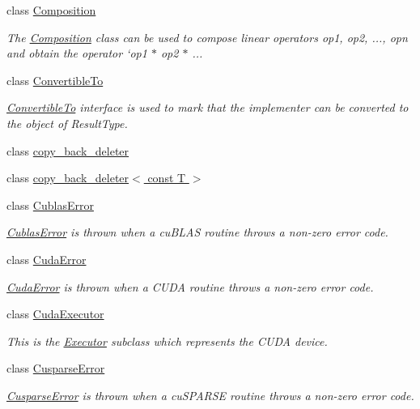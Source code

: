 \begin{DoxyCompactItemize}
class \hyperlink{classgko_1_1Composition}{Composition}
\begin{DoxyCompactList}\small\item\em The \hyperlink{classgko_1_1Composition}{Composition} class can be used to compose linear operators {\ttfamily op1, op2, ..., opn} and obtain the operator `op1 $\ast$ op2 $\ast$ ... \end{DoxyCompactList}\item 
class \hyperlink{classgko_1_1ConvertibleTo}{Convertible\+To}
\begin{DoxyCompactList}\small\item\em \hyperlink{classgko_1_1ConvertibleTo}{Convertible\+To} interface is used to mark that the implementer can be converted to the object of Result\+Type. \end{DoxyCompactList}\item 
class \hyperlink{classgko_1_1copy__back__deleter}{copy\+\_\+back\+\_\+deleter}
\item 
class \hyperlink{classgko_1_1copy__back__deleter_3_01const_01T_01_4}{copy\+\_\+back\+\_\+deleter$<$ const T $>$}
\item 
class \hyperlink{classgko_1_1CublasError}{Cublas\+Error}
\begin{DoxyCompactList}\small\item\em \hyperlink{classgko_1_1CublasError}{Cublas\+Error} is thrown when a cu\+B\+L\+AS routine throws a non-\/zero error code. \end{DoxyCompactList}\item 
class \hyperlink{classgko_1_1CudaError}{Cuda\+Error}
\begin{DoxyCompactList}\small\item\em \hyperlink{classgko_1_1CudaError}{Cuda\+Error} is thrown when a C\+U\+DA routine throws a non-\/zero error code. \end{DoxyCompactList}\item 
class \hyperlink{classgko_1_1CudaExecutor}{Cuda\+Executor}
\begin{DoxyCompactList}\small\item\em This is the \hyperlink{classgko_1_1Executor}{Executor} subclass which represents the C\+U\+DA device. \end{DoxyCompactList}\item 
class \hyperlink{classgko_1_1CusparseError}{Cusparse\+Error}
\begin{DoxyCompactList}\small\item\em \hyperlink{classgko_1_1CusparseError}{Cusparse\+Error} is thrown when a cu\+S\+P\+A\+R\+SE routine throws a non-\/zero error code. \end{DoxyCompactList}\item 

\end{DoxyCompactItemize}
